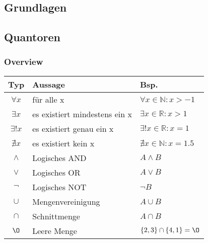 \documentclass[a3paper, 11pt, landscape]{scrartcl}
\begin{document}
	\begin{multicols*}{3}
	
	
\iffalse
\section*{Disclaimer}
			\vspace{0.2cm}
			Diese Zusammenfassung wurde zur Vorlesung "`Informatik I"' von Dr. Malte Schwerhoff und Dr. Hermann Lehner (FS20) erstellt. Die Zusammenfassung soll und darf gerne modifiziert werden (Latex-Files liegen bei), und soll dann auch weiterhin anderen Studenten zur Verfügung stehen. \\
			
			Für Korrektheit und Vollständigkeit ist keine Gewähr. Fehler bitte an jloehle@ee.ethz.ch melden, sodass auch weitere davon profitieren können.\\
			
			Josephine Loehle und Leo Landolt, \today		
			
			\vfill\null
			\pagebreak
\fi

\section{Grundlagen}

	\subsection{Quantoren}
	
		\subsubsection{Overview}
		\vspace{0.1cm}
		
		\begin{tabular} {c l l}
			\textbf{Typ} & \textbf{Aussage} & \textbf{Bsp.} \\
			\hline
			$\forall x $ & für alle x & $\forall x \in \mathbb{N}:x > -1$ \\
			$\exists x$ & es existiert mindestens ein x & $ \exists x \in \mathbb{R} :x>1$\\
			
			$\exists! x$ & es existiert genau ein x & $\exists! x \in \mathbb{R} : x=1$\\
			$\nexists x$ & es existiert kein x & $\nexists x \in \mathbb{N}:x=1.5$\\
			$\land$ & Logisches AND & $A \land B$\\
			$\lor$ & Logisches OR & $A \lor B$\\
			$\neg$ & Logisches NOT & $\neg B$\\
			$\cup$ & Mengenvereinigung & $A \cup B$ \\
			$\cap$ & Schnittmenge & $A\cap B$ \\
		    $\O$ & Leere Menge & $\{2,3\}\cap \{4,1\}=\O$
			

\end{tabular}
\end{multicols*}
\end{document}
